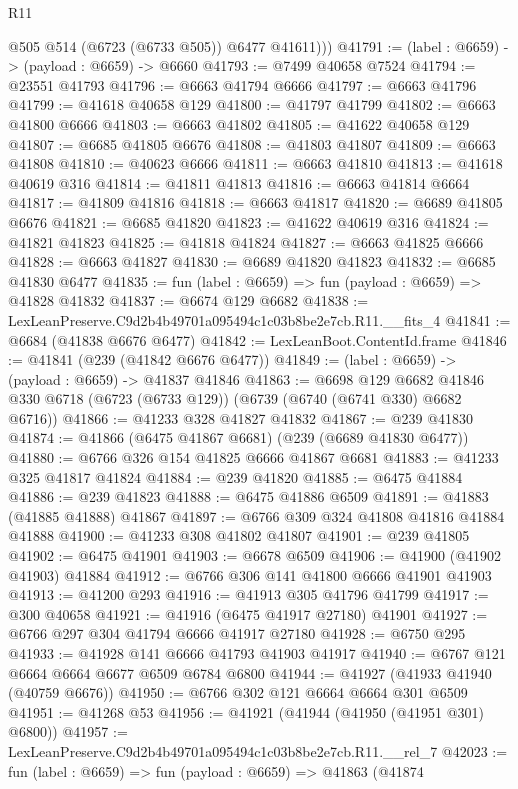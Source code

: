 \begin{lexlean}{R11}
\begin{coremodule}
          @505
          @514
          (@6723 (@6733 @505))
          @6477
          @41611)))
@41791 := (label : @6659) -> (payload : @6659) -> @6660
@41793 := @7499 @40658 @7524
@41794 := @23551 @41793
@41796 := @6663 @41794 @6666
@41797 := @6663 @41796
@41799 := @41618 @40658 @129
@41800 := @41797 @41799
@41802 := @6663 @41800 @6666
@41803 := @6663 @41802
@41805 := @41622 @40658 @129
@41807 := @6685 @41805 @6676
@41808 := @41803 @41807
@41809 := @6663 @41808
@41810 := @40623 @6666
@41811 := @6663 @41810
@41813 := @41618 @40619 @316
@41814 := @41811 @41813
@41816 := @6663 @41814 @6664
@41817 := @41809 @41816
@41818 := @6663 @41817
@41820 := @6689 @41805 @6676
@41821 := @6685 @41820
@41823 := @41622 @40619 @316
@41824 := @41821 @41823
@41825 := @41818 @41824
@41827 := @6663 @41825 @6666
@41828 := @6663 @41827
@41830 := @6689 @41820 @41823
@41832 := @6685 @41830 @6477
@41835 := fun (label : @6659) => fun (payload : @6659) => @41828 @41832
@41837 := @6674 @129 @6682
@41838 := LexLeanPreserve.C9d2b4b49701a095494c1c03b8be2e7cb.R11.__fits_4
@41841 := @6684 (@41838 @6676 @6477)
@41842 := LexLeanBoot.ContentId.frame
@41846 := @41841 (@239 (@41842 @6676 @6477))
@41849 := (label : @6659) -> (payload : @6659) -> @41837 @41846
@41863 := @6698
    @129
    @6682
    @41846
    @330
    @6718
    (@6723 (@6733 @129))
    (@6739 (@6740 (@6741 @330) @6682 @6716))
@41866 := @41233 @328 @41827 @41832
@41867 := @239 @41830
@41874 := @41866 (@6475 @41867 @6681) (@239 (@6689 @41830 @6477))
@41880 := @6766 @326 @154 @41825 @6666 @41867 @6681
@41883 := @41233 @325 @41817 @41824
@41884 := @239 @41820
@41885 := @6475 @41884
@41886 := @239 @41823
@41888 := @6475 @41886 @6509
@41891 := @41883 (@41885 @41888) @41867
@41897 := @6766 @309 @324 @41808 @41816 @41884 @41888
@41900 := @41233 @308 @41802 @41807
@41901 := @239 @41805
@41902 := @6475 @41901
@41903 := @6678 @6509
@41906 := @41900 (@41902 @41903) @41884
@41912 := @6766 @306 @141 @41800 @6666 @41901 @41903
@41913 := @41200 @293
@41916 := @41913 @305 @41796 @41799
@41917 := @300 @40658
@41921 := @41916 (@6475 @41917 @27180) @41901
@41927 := @6766 @297 @304 @41794 @6666 @41917 @27180
@41928 := @6750 @295
@41933 := @41928 @141 @6666 @41793 @41903 @41917
@41940 := @6767 @121 @6664 @6664 @6677 @6509 @6784 @6800
@41944 := @41927 (@41933 @41940 (@40759 @6676))
@41950 := @6766 @302 @121 @6664 @6664 @301 @6509
@41951 := @41268 @53
@41956 := @41921 (@41944 (@41950 (@41951 @301) @6800))
@41957 := LexLeanPreserve.C9d2b4b49701a095494c1c03b8be2e7cb.R11.__rel_7
@42023 := fun (label : @6659) =>
  fun (payload : @6659) =>
  @41863
    (@41874

\end{coremodule}
\end{lexlean}
